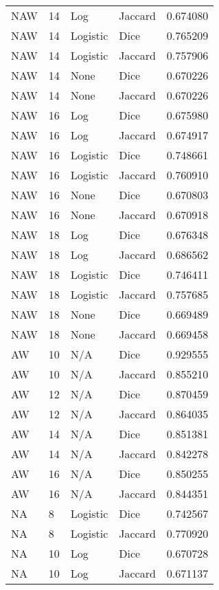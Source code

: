 \documentclass{article}
\begin{document}
\begin{center}
\begin{supertabular}{| l | l | l | l | l |}
            NAW & 14 & Log & Jaccard & 0.674080 \\
            NAW & 14 & Logistic & Dice & 0.765209 \\
            NAW & 14 & Logistic & Jaccard & 0.757906 \\
            NAW & 14 & None & Dice & 0.670226 \\
            NAW & 14 & None & Jaccard & 0.670226 \\
            NAW & 16 & Log & Dice & 0.675980 \\
            NAW & 16 & Log & Jaccard & 0.674917 \\
            NAW & 16 & Logistic & Dice & 0.748661 \\
            NAW & 16 & Logistic & Jaccard & 0.760910 \\
            NAW & 16 & None & Dice & 0.670803 \\
            NAW & 16 & None & Jaccard & 0.670918 \\
            NAW & 18 & Log & Dice & 0.676348 \\
            NAW & 18 & Log & Jaccard & 0.686562 \\
            NAW & 18 & Logistic & Dice & 0.746411 \\
            NAW & 18 & Logistic & Jaccard & 0.757685 \\
            NAW & 18 & None & Dice & 0.669489 \\
            NAW & 18 & None & Jaccard & 0.669458 \\
            AW & 10 & N/A & Dice & 0.929555 \\
            AW & 10 & N/A & Jaccard & 0.855210 \\
            AW & 12 & N/A & Dice & 0.870459 \\
            AW & 12 & N/A & Jaccard & 0.864035 \\
            AW & 14 & N/A & Dice & 0.851381 \\
            AW & 14 & N/A & Jaccard & 0.842278 \\
            AW & 16 & N/A & Dice & 0.850255 \\
            AW & 16 & N/A & Jaccard & 0.844351 \\
            NA & 8 & Logistic & Dice & 0.742567 \\
            NA & 8 & Logistic & Jaccard & 0.770920 \\
            NA & 10 & Log & Dice & 0.670728 \\
            NA & 10 & Log & Jaccard & 0.671137 \\

\end{supertabular}
\end{center}
\end{document}

